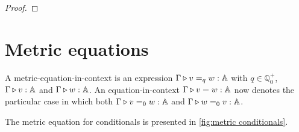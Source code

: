 \documentclass[10pt,a4paper]{amsart}
\theoremstyle{definition}
\theoremstyle{definition}
\theoremstyle{definition}
\theoremstyle{definition}
\theoremstyle{definition}
\theoremstyle{definition}
\begin{document}
\begin{proof}
\begin{comment}
      &\inr_{\typeA}(y) \Rightarrow  \inr_{\typeA}(a'') \otimes b'' [z/ a \otimes b] [y'/a''\otimes b''] [x \otimes b/ y']
    \end{aligned} \right\}  & (\beta_{\text{case}}^{\text{inl}} \text{ and } \beta_{\text{case}}^{\text{inr}}) \\
  & = \text{ case } a\, \left\{ 
    \begin{aligned}
        &\inl_{\typeB}(x) \Rightarrow  \inl_{\typeB}(a') \otimes b' [z/ a \otimes b] [x \otimes b/a'\otimes b'];\\
        &\inr_{\typeA}(y) \Rightarrow  \inr_{\typeA}(a'') \otimes b'' [z/ a \otimes b] [x \otimes b/a''\otimes b''] 
    \end{aligned} \right\}  &  \\
  & = \text{ case } a\, \left\{
    \begin{aligned}
      &\inl_{\typeB}(x) \Rightarrow  \inl_{\typeB}(x) \otimes b;\\
      &\inr_{\typeA}(y) \Rightarrow  \inr_{\typeA}(x) \otimes b
    \end{aligned} \right\}  [z/ a \otimes b]  & (\beta_{\otimes_{e}}) \\
  & = a \otimes b [z/ a \otimes b] = z = [z] & (\eta_{\text{case}})
\end{align*} 
\end{comment}

\end{proof}


\section{Metric equations}

A metric-equation-in-context is an expression $\Gamma \triangleright v =_q w : \mathbb{A}$ with $q \in \mathbb{Q}^+_0$, $\Gamma \triangleright v : \mathbb{A}$
and $\Gamma \triangleright w : \mathbb{A}$.  An equation-in-context $\Gamma \triangleright v = w : \mathbb{A}$ now denotes the particular case in which both $\Gamma \triangleright v =_0 w : \mathbb{A}$ and $\Gamma \triangleright w =_0 v : \mathbb{A}$.

The metric equation for conditionals is presented in \autoref{fig:metric conditionals}. 
\end{document}
